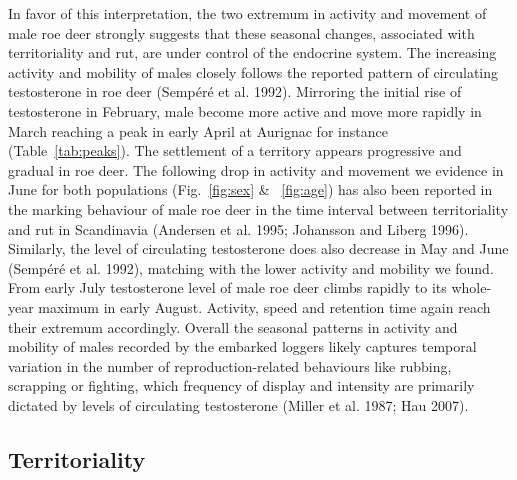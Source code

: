 \documentclass[a4paper,11pt]{article}
\begin{document}

In favor of this interpretation, the two extremum in activity and movement of male roe deer strongly suggests that these seasonal changes, associated with territoriality and rut, are under control of the endocrine system. The increasing activity and mobility of males closely follows the reported pattern of circulating testosterone in roe deer (Sempéré et al. 1992). Mirroring the initial rise of testosterone in February, male become more active and move more rapidly in March reaching a peak in early April at Aurignac for instance (Table~\ref{tab:peaks}). The settlement of a territory appears progressive and gradual in roe deer. The following drop in activity and movement we evidence in June for both populations (Fig.~\ref{fig:sex} \& ~\ref{fig:age}) has also been reported in the marking behaviour of male roe deer in the time interval between territoriality and rut in Scandinavia (Andersen et al. 1995; Johansson and Liberg 1996). Similarly, the level of circulating testosterone does also decrease in May and June (Sempéré et al. 1992), matching with the lower activity and mobility we found. From early July testosterone level of male roe deer climbs rapidly to its whole-year maximum in early August. Activity, speed and retention time again reach their extremum accordingly. Overall the seasonal patterns in activity and mobility of males recorded by the embarked loggers likely captures temporal variation in the number of reproduction-related behaviours like rubbing, scrapping or fighting, which frequency of display and intensity are primarily dictated by levels of circulating testosterone (Miller et al. 1987; Hau 2007).



\subsection*{Territoriality}
\end{document}
